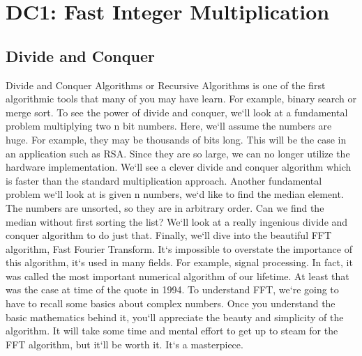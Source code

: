 \section{DC1: Fast Integer Multiplication}

\subsection{Divide and Conquer}
Divide and Conquer Algorithms or Recursive Algorithms is one of the first algorithmic tools that many of you may have learn.
For example, binary search or merge sort.
To see the power of divide and conquer, we`ll look at a fundamental problem multiplying two n bit numbers.
Here, we`ll assume the numbers are huge.
For example, they may be thousands of bits long.
This will be the case in an application such as RSA\@.
Since they are so large, we can no longer utilize the hardware implementation.
We`ll see a clever divide and conquer algorithm which is faster than the standard multiplication approach.
Another fundamental problem we`ll look at is given n numbers, we`d like to find the median element.
The numbers are unsorted, so they are in arbitrary order.
Can we find the median without first sorting the list? We`ll look at a really ingenious divide and conquer algorithm to do just that.
Finally, we`ll dive into the beautiful FFT algorithm, Fast Fourier Transform.
It`s impossible to overstate the importance of this algorithm, it`s used in many fields.
For example, signal processing.
In fact, it was called the most important numerical algorithm of our lifetime.
At least that was the case at time of the quote in 1994.
To understand FFT, we`re going to have to recall some basics about complex numbers.
Once you understand the basic mathematics behind it, you`ll appreciate the beauty and simplicity of the algorithm.
It will take some time and mental effort to get up to steam for the FFT algorithm, but it`ll be worth it.
It`s a masterpiece.

